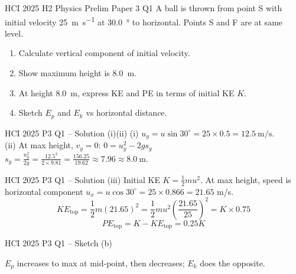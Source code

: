 \documentclass{beamer}
\begin{document}
\begin{frame}[t,shrink=15]{HCI 2025 H2 Physics Prelim Paper 3 Q1}
A ball is thrown from point S with initial velocity \SI{25}{\meter\per\second} at \SI{30.0}{\degree} to horizontal. Points S and F are at same level.
\begin{enumerate}
    \item[(a)(i)] Calculate vertical component of initial velocity.
    \item[(a)(ii)] Show maximum height is \SI{8.0}{\m}.
    \item[(a)(iii)] At height \SI{8.0}{\m}, express KE and PE in terms of initial KE $K$.
    \item[(b)] Sketch $E_p$ and $E_k$ vs horizontal distance.
\end{enumerate}
\end{frame}

\begin{frame}[shrink=15]{HCI 2025 P3 Q1 – Solution (i)(ii)}
(i) $u_y = u\sin30^\circ = 25 \times 0.5 = \SI{12.5}{\meter\per\second}$. \\
(ii) At max height, $v_y = 0$: $0 = u_y^2 - 2g s_y$ \\
$s_y = \frac{u_y^2}{2g} = \frac{12.5^2}{2\times9.81} = \frac{156.25}{19.62} \approx 7.96 \approx \SI{8.0}{\m}$.
\end{frame}

\begin{frame}[shrink=15]{HCI 2025 P3 Q1 – Solution (iii)}
Initial KE $K = \frac12 m u^2$. At max height, speed is horizontal component $u_x = u\cos30^\circ = 25 \times 0.866 = 21.65$ m/s.
\[ KE_{\text{top}} = \frac12 m (21.65)^2 = \frac12 m u^2 \left(\frac{21.65}{25}\right)^2 = K \times 0.75 \]
\[ PE_{\text{top}} = K - KE_{\text{top}} = 0.25K \]
\end{frame}

\begin{frame}[shrink=15]{HCI 2025 P3 Q1 – Sketch (b)}
\begin{center}
\end{center}
$E_p$ increases to max at mid‑point, then decreases; $E_k$ does the opposite.
\end{frame}
\end{document}
